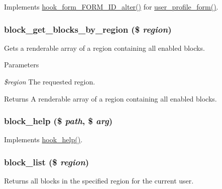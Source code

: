 \label{block_8module_a949dd339f782c50a64b0fb7e1c55b7b2}
Implements \hyperlink{group__hooks_ga8d4a4089551493d55911bd5c4f218264}{hook\_\-form\_\-FORM\_\-ID\_\-alter()} for \hyperlink{group__forms_ga600bbf7cf395cbfedae1c3bc33727346}{user\_\-profile\_\-form()}. \hypertarget{block_8module_a24738e61e8de38a23d6a2b333eb84817}{
\subsubsection[{block\_\-get\_\-blocks\_\-by\_\-region}]{\setlength{\rightskip}{0pt plus 5cm}block\_\-get\_\-blocks\_\-by\_\-region (\$ {\em region})}}
\label{block_8module_a24738e61e8de38a23d6a2b333eb84817}
Gets a renderable array of a region containing all enabled blocks.


\begin{DoxyParams}{Parameters}
\item[{\em \$region}]The requested region.\end{DoxyParams}
\begin{DoxyReturn}{Returns}
A renderable array of a region containing all enabled blocks. 
\end{DoxyReturn}
\hypertarget{block_8module_a7e5b76030048a2d65c8e619456b72081}{
\subsubsection[{block\_\-help}]{\setlength{\rightskip}{0pt plus 5cm}block\_\-help (\$ {\em path}, \/  \$ {\em arg})}}
\label{block_8module_a7e5b76030048a2d65c8e619456b72081}
Implements \hyperlink{group__hooks_ga5589c2714a782738e8851c4c90231f0e}{hook\_\-help()}. \hypertarget{block_8module_a38999f916243ed473763738bddea9a6b}{
\subsubsection[{block\_\-list}]{\setlength{\rightskip}{0pt plus 5cm}block\_\-list (\$ {\em region})}}
\label{block_8module_a38999f916243ed473763738bddea9a6b}
Returns all blocks in the specified region for the current user.


